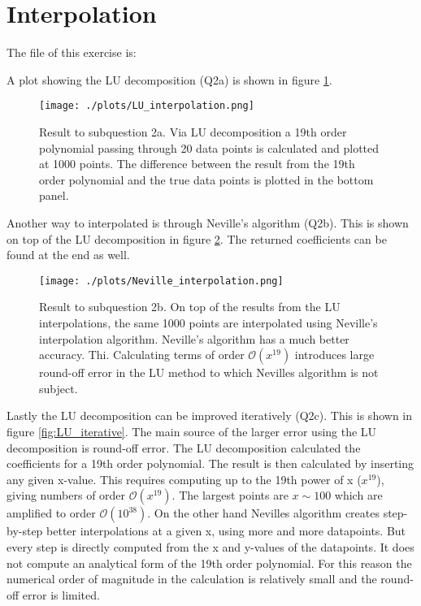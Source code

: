 \section{Interpolation}

The file of this exercise is:



A plot showing the LU decomposition (Q2a) is shown in figure \ref{fig:LU}.

\begin{figure}[h!]
  \centering
  \texttt{[image: ./plots/LU\_interpolation.png]}
  \caption{Result to subquestion 2a. Via LU decomposition a 19th order polynomial passing through 20 data points is calculated and plotted at 1000 points. The difference between the result from the 19th order polynomial and the true data points is plotted in the bottom panel.}
  \label{fig:LU}
\end{figure}

Another way to interpolated is through Neville's algorithm (Q2b). This is shown on top of the LU decomposition in figure \ref{fig:Neville}. The returned coefficients can be found at the end as well.

\begin{figure}[h!]
  \centering
  \texttt{[image: ./plots/Neville\_interpolation.png]}
  \caption{Result to subquestion 2b. On top of the results from the LU interpolations, the same 1000 points are interpolated using Neville's interpolation algorithm. Neville's algorithm has a much better accuracy. Thi. Calculating terms of order $\mathcal{O}(x^{19})$ introduces large round-off error in the LU method to which Nevilles algorithm is not subject.}
  \label{fig:Neville}
\end{figure}

Lastly the LU decomposition can be improved iteratively (Q2c). This is shown in figure \ref{fig:LU_iterative}. The main source of the larger error using the LU decomposition is round-off error. The LU decomposition calculated the coefficients for a 19th order polynomial. The result is then calculated by inserting any given x-value. This requires computing up to the 19th power of x ($x^{19}$), giving numbers of order $\mathcal{O}(x^{19})$. The largest points are $x\sim100$ which are amplified to order $\mathcal{O}(10^{38})$. On the other hand Nevilles algorithm creates step-by-step better interpolations at a given x, using more and more datapoints. But every step is directly computed from the x and y-values of the datapoints. It does not compute an analytical form of the 19th order polynomial. For this reason the numerical order of magnitude in the calculation is relatively small and the round-off error is limited.

